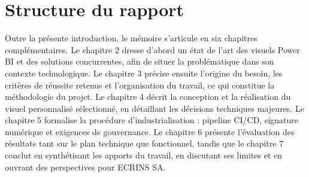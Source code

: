\section{Structure du rapport}

Outre la présente introduction, le mémoire s’articule en six chapitres complémentaires. Le chapitre 2 dresse d’abord un état de l’art des visuels Power BI et des solutions concurrentes, afin de situer la problématique dans son contexte technologique. Le chapitre 3 précise ensuite l’origine du besoin, les critères de réussite retenus et l’organisation du travail, ce qui constitue la méthodologie du projet. Le chapitre 4 décrit la conception et la réalisation du visuel personnalisé sélectionné, en détaillant les décisions techniques majeures. Le chapitre 5 formalise la procédure d’industrialisation : pipeline CI/CD, signature numérique et exigences de gouvernance. Le chapitre 6 présente l’évaluation des résultats tant sur le plan technique que fonctionnel, tandis que le chapitre 7 conclut en synthétisant les apports du travail, en discutant ses limites et en ouvrant des perspectives pour ECRINS SA.

